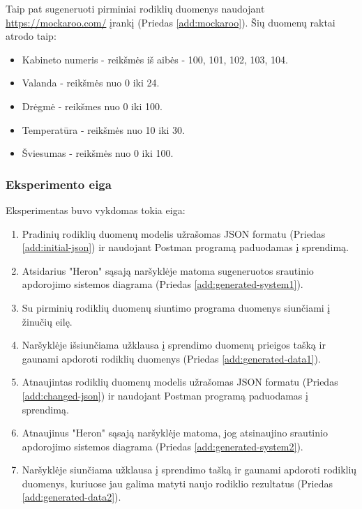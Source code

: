 \documentclass{VUMIFPSbakalaurinis}
\begin{document}
\noindent Taip pat sugeneruoti pirminiai rodiklių duomenys naudojant \url{https://mockaroo.com/} įrankį (Priedas \ref{add:mockaroo}). Šių duomenų raktai atrodo taip:
\begin{itemize}
    \item Kabineto numeris - reikšmės iš aibės - 100, 101, 102, 103, 104.
    \item Valanda - reikšmės nuo 0 iki 24.
    \item Drėgmė - reikšmes nuo 0 iki 100.
    \item Temperatūra - reikšmės nuo 10 iki 30.
    \item Šviesumas - reikšmės nuo 0 iki 100.
\end{itemize}

\subsubsection{Eksperimento eiga}

Eksperimentas buvo vykdomas tokia eiga:
\begin{enumerate}
    \item Pradinių rodiklių duomenų modelis užrašomas JSON formatu (Priedas \ref{add:initial-json}) ir naudojant Postman programą paduodamas į sprendimą.
    \item Atsidarius "Heron" sąsają naršyklėje matoma sugeneruotos srautinio apdorojimo sistemos diagrama (Priedas \ref{add:generated-system1}).
    \item Su pirminių rodiklių duomenų siuntimo programa duomenys siunčiami į žinučių eilę.
    \item Naršyklėje išsiunčiama užklausa į sprendimo duomenų prieigos tašką ir gaunami apdoroti rodiklių duomenys (Priedas \ref{add:generated-data1}).
    \item Atnaujintas rodiklių duomenų modelis užrašomas JSON formatu (Priedas \ref{add:changed-json}) ir naudojant Postman programą paduodamas į sprendimą.
    \item Atnaujinus "Heron" sąsają naršyklėje matoma, jog atsinaujino srautinio apdorojimo sistemos diagrama (Priedas \ref{add:generated-system2}).
    \item Naršyklėje siunčiama užklausa į sprendimo tašką ir gaunami apdoroti rodiklių duomenys, kuriuose jau galima matyti naujo rodiklio rezultatus (Priedas \ref{add:generated-data2}).
\end{enumerate}
\end{document}
